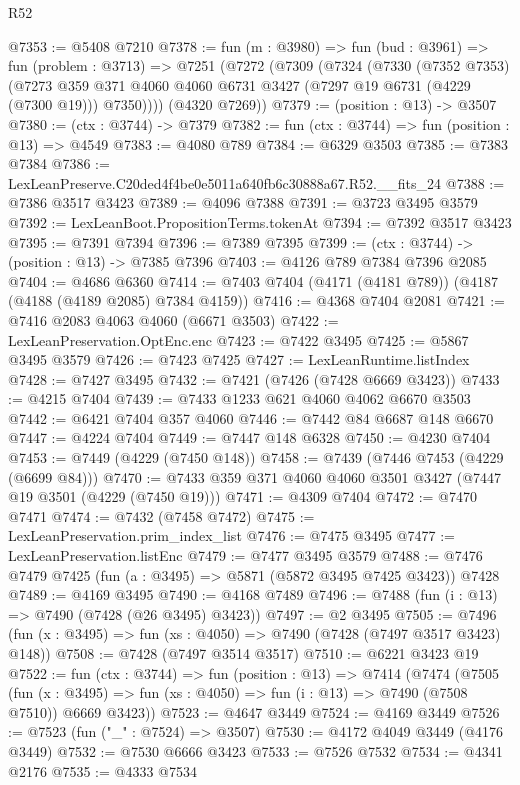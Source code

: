 \begin{lexlean}{R52}
\begin{coremodule}
@7353 := @5408 @7210
@7378 := fun (m : @3980) =>
  fun (bud : @3961) =>
  fun (problem : @3713) =>
  @7251
    (@7272
      (@7309
        (@7324
          (@7330
            (@7352 @7353)
            (@7273 @359 @371 @4060 @4060 @6731 @3427 (@7297 @19 @6731 (@4229 (@7300 @19))) @7350))))
      (@4320 @7269))
@7379 := (position : @13) -> @3507
@7380 := (ctx : @3744) -> @7379
@7382 := fun (ctx : @3744) => fun (position : @13) => @4549
@7383 := @4080 @789
@7384 := @6329 @3503
@7385 := @7383 @7384
@7386 := LexLeanPreserve.C20ded4f4be0e5011a640fb6c30888a67.R52.__fits_24
@7388 := @7386 @3517 @3423
@7389 := @4096 @7388
@7391 := @3723 @3495 @3579
@7392 := LexLeanBoot.PropositionTerms.tokenAt
@7394 := @7392 @3517 @3423
@7395 := @7391 @7394
@7396 := @7389 @7395
@7399 := (ctx : @3744) -> (position : @13) -> @7385 @7396
@7403 := @4126 @789 @7384 @7396 @2085
@7404 := @4686 @6360
@7414 := @7403 @7404 (@4171 (@4181 @789)) (@4187 (@4188 (@4189 @2085) @7384 @4159))
@7416 := @4368 @7404 @2081
@7421 := @7416 @2083 @4063 @4060 (@6671 @3503)
@7422 := LexLeanPreservation.OptEnc.enc
@7423 := @7422 @3495
@7425 := @5867 @3495 @3579
@7426 := @7423 @7425
@7427 := LexLeanRuntime.listIndex
@7428 := @7427 @3495
@7432 := @7421 (@7426 (@7428 @6669 @3423))
@7433 := @4215 @7404
@7439 := @7433 @1233 @621 @4060 @4062 @6670 @3503
@7442 := @6421 @7404 @357 @4060
@7446 := @7442 @84 @6687 @148 @6670
@7447 := @4224 @7404
@7449 := @7447 @148 @6328
@7450 := @4230 @7404
@7453 := @7449 (@4229 (@7450 @148))
@7458 := @7439 (@7446 @7453 (@4229 (@6699 @84)))
@7470 := @7433 @359 @371 @4060 @4060 @3501 @3427 (@7447 @19 @3501 (@4229 (@7450 @19)))
@7471 := @4309 @7404
@7472 := @7470 @7471
@7474 := @7432 (@7458 @7472)
@7475 := LexLeanPreservation.prim_index_list
@7476 := @7475 @3495
@7477 := LexLeanPreservation.listEnc
@7479 := @7477 @3495 @3579
@7488 := @7476 @7479 @7425 (fun (a : @3495) => @5871 (@5872 @3495 @7425 @3423)) @7428
@7489 := @4169 @3495
@7490 := @4168 @7489
@7496 := @7488 (fun (i : @13) => @7490 (@7428 (@26 @3495) @3423))
@7497 := @2 @3495
@7505 := @7496 (fun (x : @3495) => fun (xs : @4050) => @7490 (@7428 (@7497 @3517 @3423) @148))
@7508 := @7428 (@7497 @3514 @3517)
@7510 := @6221 @3423 @19
@7522 := fun (ctx : @3744) =>
  fun (position : @13) =>
  @7414
    (@7474
      (@7505
        (fun (x : @3495) => fun (xs : @4050) => fun (i : @13) => @7490 (@7508 @7510))
        @6669
        @3423))
@7523 := @4647 @3449
@7524 := @4169 @3449
@7526 := @7523 (fun ("_" : @7524) => @3507)
@7530 := @4172 @4049 @3449 (@4176 @3449)
@7532 := @7530 @6666 @3423
@7533 := @7526 @7532
@7534 := @4341 @2176
@7535 := @4333 @7534

\end{coremodule}
\end{lexlean}
